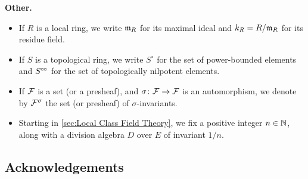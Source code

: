 \documentclass[../main.tex]{subfiles}
\begin{document}
\textbf{Other.}\vspace{-1em}
\begin{itemize}
  \item If $R$ is a local ring, we write $\mathfrak{m}_R$ for its maximal ideal and 
    $k_R = R/\mathfrak{m}_R$ for its residue field. 
  \item If $S$ is a topological ring, we write $S^\circ$ for the set of power-bounded
    elements and $S^{\circ \hspace{-0.5pt} \circ}$ for the set of topologically nilpotent elements.
  \item If $\mathcal{F}$ is a set (or a presheaf), and $\sigma\colon \mathcal{F} \to \mathcal{F}$ is an
    automorphism, we denote by $\mathcal{F}^\sigma$ the set (or presheaf) of 
    $\sigma$-invariants.
  \item Starting in \cref{sec:Local Class Field Theory}, we fix a positive
    integer $n \in \mathbb{N}$, along with a division algebra $D$ over $E$ of invariant $1/n$. 
\end{itemize}


\subsection*{Acknowledgements} %

\end{document}
